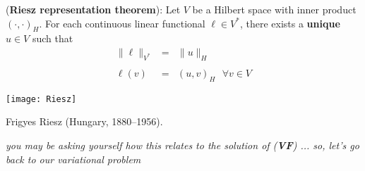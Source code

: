\begin{theorem}
 (\textbf{Riesz representation theorem}):
Let $V$ be a Hilbert space with inner product $(\cdot,\cdot)_H$.
For each continuous linear functional $\ell \in V^{*}$, there exists a \textbf{unique}
$u \in V$ such that
\begin{equation}
\left.
\begin{array}{rll}
\lVert \ell \rVert_{V^*} & = & \lVert u \rVert_H \\
& \\
\ell(v) & = & (u,v)_H ~~~\forall v \in V
\end{array}
\right. \nonumber
\end{equation}
\end{theorem}
\begin{marginfigure}[-4.0cm]
       \texttt{[image: Riesz]}
       \caption[]{Frigyes Riesz (Hungary, 1880--1956).} 
\end{marginfigure}

\emph{you may be asking yourself how this relates
to the solution of (\textbf{VF}) ...
so, let's go back to our variational problem}

